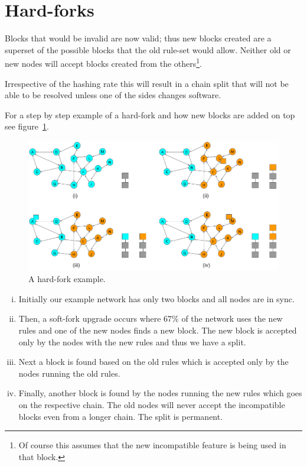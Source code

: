 \section{Hard-forks}
Blocks that would be invalid are now valid; thus new blocks created are a superset of the possible blocks that the old rule-set would allow. Neither old or new nodes will accept blocks created from the others\footnote{Of course this assumes that the new incompatible feature is being used in that block.}.

Irrespective of the hashing rate this will result in a chain split that will not be able to be resolved unless one of the sides changes software.

For a step by step example of a hard-fork and how new blocks are added on top see figure~\ref{fig:hard-fork-example}.

\begin{figure}[h]
\begin{center}
\includegraphics[scale=0.4]{images/hard-fork-example}
\caption{A hard-fork example.}
\label{fig:hard-fork-example}
\end{center}
\end{figure}

\begin{enumerate}[(i)]
\item Initially our example network has only two blocks and all nodes are in sync.
\item Then, a soft-fork upgrade occurs where 67\% of the network uses the new rules and one of the new nodes finds a new block. The new block is accepted only by the nodes with the new rules and thus we have a split.
\item Next a block is found based on the old rules which is accepted only by the nodes running the old rules.
\item Finally, another block is found by the nodes running the new rules which goes on the respective chain. The old nodes will never accept the incompatible blocks even from a longer chain. The split is permanent.
\end{enumerate}


